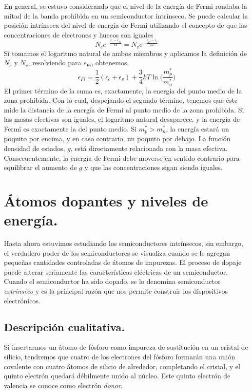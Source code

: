 \documentclass[12pt,a4paper]{article}
\begin{document}
En general, se estuvo considerando que el nivel de la energía de Fermi rondaba la mitad de la banda prohibida en un semiconductor intrínseco. Se puede calcular la posición intrínseca del nivel de energía de Fermi utilizando el concepto de que las concentraciones de electrones y huecos son iguales
\[  N_{c} e^{-\frac{\epsilon _{c} - \epsilon _{Fi}}{kT}} = N_{v} e^{-\frac{\epsilon _{Fi} - \epsilon _{v}}{kT}} \]
Si tomamos el logaritmo natural de ambos miembros y aplicamos la definición de $N_{c}$ y $N_{v}$, resolviendo para $\epsilon _{Fi}$, obtenemos
\[ \epsilon _{Fi} = \frac{1}{2} (\epsilon _{c} + \epsilon _{v}) + \frac{3}{4} kT \ln \bigg( \frac{m_{p}^{\ast}}{m_{n}^{\ast}} \bigg) \]
El primer término de la suma es, exactamente, la energía del punto medio de la zona prohibida. Con lo cual, despejando el segundo término, tenemos que éste mide la distancia de la energía de Fermi al punto medio de la zona prohibida. Si las masas efectivas son iguales, el logaritmo natural desaparece, y la energía de Fermi es exactamente la del punto medio. Si $m_{p}^{\ast} > m_{n}^{\ast}$, la energía estará un poquito por encima, y en caso contrario, un poquito por debajo. La función densidad de estados, $g$, está directamente relacionada con la masa efectiva. Consecuentemente, la energía de Fermi debe moverse en sentido contrario para equilibrar el aumento de $g$ y que las concentraciones sigan siendo iguales.

\section{Átomos dopantes y niveles de energía.}

Hasta ahora estuvimos estudiando los semiconductores intrínsecos, sin embargo, el verdadero poder de los semiconductores se visualiza cuando se le agregan pequeñas cantidades controladas de átomos de impurezas. El proceso de dopaje puede alterar seriamente las características eléctricas de un semiconductor. Cuando el semiconductor ha sido dopado, se lo denomina semiconductor \emph{extrínseco} y es la principal razón que nos permite construir los dispositivos electrónicos.

\subsection{Descripción cualitativa.}

Si insertarmos un átomo de fósforo como impureza de sustitución en un cristal de silicio, tendremos que cuatro de los electrones del fósforo formarán una unión covalente con cuatro átomos de silicio de alrededor, completando el cristal, y el quinto electrón quedará débilmente unido al núcleo. Este quinto electrón de valencia se conoce como electrón \emph{donor}.
\end{document}
